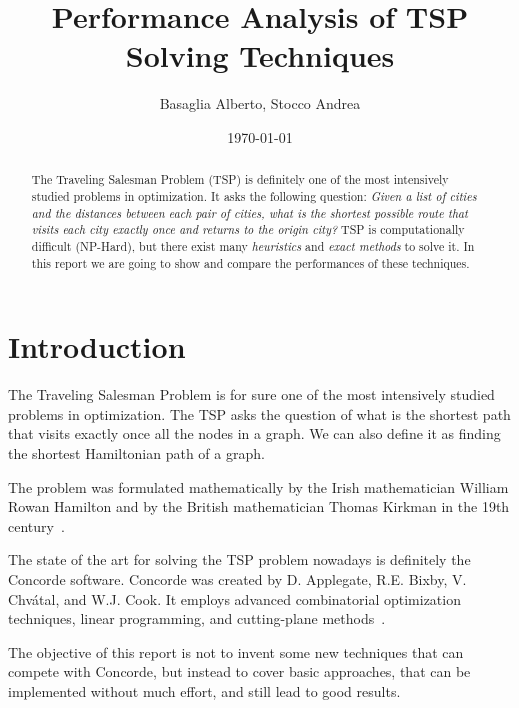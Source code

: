 \documentclass{article}
\title{Performance Analysis of TSP Solving Techniques}
\author{Basaglia Alberto, Stocco Andrea}
\date{\today}
\begin{document}
\maketitle

\newpage

\begin{abstract}
The Traveling Salesman Problem (TSP) is definitely one of the most intensively studied problems in optimization.
It asks the following question:
\textit{Given a list of cities and the distances between each pair of cities, what is the shortest possible route
that visits each city exactly once and returns to the origin city?}
TSP is computationally difficult (NP-Hard), but there exist many \textit{heuristics} and \textit{exact methods} to solve it.
In this report we are going to show and compare the performances of these
techniques.
\end{abstract}

\newpage
\maketitle
\newpage
\tableofcontents
\newpage

\pagestyle{fancy}

\section{Introduction}
The Traveling Salesman Problem is for sure one of the most intensively studied problems in
optimization. The TSP asks the question of what is the shortest path that visits exactly
once all the nodes in a graph.
We can also define it as finding the shortest Hamiltonian path of a graph.

The problem was formulated mathematically by the Irish mathematician William Rowan
Hamilton and by the British mathematician Thomas Kirkman in the 19th century~\cite{biggs1986graph}.

The state of the art for solving the TSP problem nowadays is definitely the Concorde
software. Concorde was created by  D. Applegate, R.E. Bixby, V. Chvátal, and W.J. Cook.
It employs advanced combinatorial optimization techniques, linear programming, and cutting-plane methods~\cite{applegate1998solution}\cite{tuHu2022analyzing}.

The objective of this report is not to invent some new techniques that can compete with Concorde,
but instead to cover basic approaches, that can be implemented without much effort, and still lead
to good results.
\end{document}
